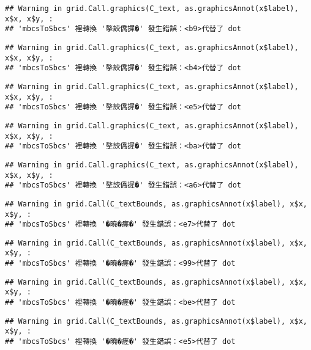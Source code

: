 \documentclass[
]{article}
\begin{document}
\begin{verbatim}
## Warning in grid.Call.graphics(C_text, as.graphicsAnnot(x$label), x$x, x$y, :
## 'mbcsToSbcs' 裡轉換 '摮詨僑摨�' 發生錯誤：<b9>代替了 dot
\end{verbatim}

\begin{verbatim}
## Warning in grid.Call.graphics(C_text, as.graphicsAnnot(x$label), x$x, x$y, :
## 'mbcsToSbcs' 裡轉換 '摮詨僑摨�' 發生錯誤：<b4>代替了 dot
\end{verbatim}

\begin{verbatim}
## Warning in grid.Call.graphics(C_text, as.graphicsAnnot(x$label), x$x, x$y, :
## 'mbcsToSbcs' 裡轉換 '摮詨僑摨�' 發生錯誤：<e5>代替了 dot
\end{verbatim}

\begin{verbatim}
## Warning in grid.Call.graphics(C_text, as.graphicsAnnot(x$label), x$x, x$y, :
## 'mbcsToSbcs' 裡轉換 '摮詨僑摨�' 發生錯誤：<ba>代替了 dot
\end{verbatim}

\begin{verbatim}
## Warning in grid.Call.graphics(C_text, as.graphicsAnnot(x$label), x$x, x$y, :
## 'mbcsToSbcs' 裡轉換 '摮詨僑摨�' 發生錯誤：<a6>代替了 dot
\end{verbatim}

\begin{verbatim}
## Warning in grid.Call(C_textBounds, as.graphicsAnnot(x$label), x$x, x$y, :
## 'mbcsToSbcs' 裡轉換 '�曉�瘥�' 發生錯誤：<e7>代替了 dot
\end{verbatim}

\begin{verbatim}
## Warning in grid.Call(C_textBounds, as.graphicsAnnot(x$label), x$x, x$y, :
## 'mbcsToSbcs' 裡轉換 '�曉�瘥�' 發生錯誤：<99>代替了 dot
\end{verbatim}

\begin{verbatim}
## Warning in grid.Call(C_textBounds, as.graphicsAnnot(x$label), x$x, x$y, :
## 'mbcsToSbcs' 裡轉換 '�曉�瘥�' 發生錯誤：<be>代替了 dot
\end{verbatim}

\begin{verbatim}
## Warning in grid.Call(C_textBounds, as.graphicsAnnot(x$label), x$x, x$y, :
## 'mbcsToSbcs' 裡轉換 '�曉�瘥�' 發生錯誤：<e5>代替了 dot
\end{verbatim}
\end{document}
